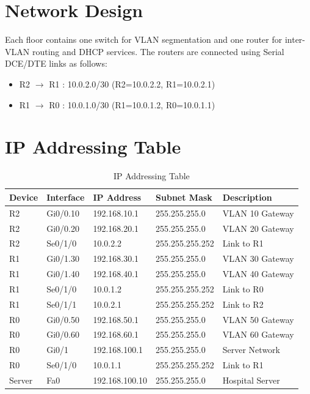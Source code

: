 \documentclass[12pt, a4paper]{article}
\begin{document}
\section{Network Design}

Each floor contains one switch for VLAN segmentation and one router for 
inter-VLAN routing and DHCP services. The routers are connected using 
Serial DCE/DTE links as follows:

\begin{itemize}
    \item R2 $\rightarrow$ R1 : 10.0.2.0/30 (R2=10.0.2.2, R1=10.0.2.1)
    \item R1 $\rightarrow$ R0 : 10.0.1.0/30 (R1=10.0.1.2, R0=10.0.1.1)
\end{itemize}

\section{IP Addressing Table}

\begin{table}[h!]
\centering
\begin{tabular}{|l|l|l|l|l|}
\hline
\textbf{Device} & \textbf{Interface} & \textbf{IP Address} & 
\textbf{Subnet Mask} & \textbf{Description} \\
\hline
R2 & Gi0/0.10 & 192.168.10.1 & 255.255.255.0   & VLAN 10 Gateway \\
R2 & Gi0/0.20 & 192.168.20.1 & 255.255.255.0   & VLAN 20 Gateway \\
R2 & Se0/1/0  & 10.0.2.2     & 255.255.255.252 & Link to R1      \\
\hline
R1 & Gi0/1.30 & 192.168.30.1 & 255.255.255.0   & VLAN 30 Gateway \\
R1 & Gi0/1.40 & 192.168.40.1 & 255.255.255.0   & VLAN 40 Gateway \\
R1 & Se0/1/0  & 10.0.1.2     & 255.255.255.252 & Link to R0      \\
R1 & Se0/1/1  & 10.0.2.1     & 255.255.255.252 & Link to R2      \\
\hline
R0 & Gi0/0.50 & 192.168.50.1  & 255.255.255.0   & VLAN 50 Gateway \\
R0 & Gi0/0.60 & 192.168.60.1  & 255.255.255.0   & VLAN 60 Gateway \\
R0 & Gi0/1    & 192.168.100.1 & 255.255.255.0   & Server Network  \\
R0 & Se0/1/0  & 10.0.1.1      & 255.255.255.252 & Link to R1      \\
\hline
Server & Fa0  & 192.168.100.10 & 255.255.255.0  & Hospital Server \\
\hline
\end{tabular}
\caption{IP Addressing Table}
\end{table}
\end{document}
